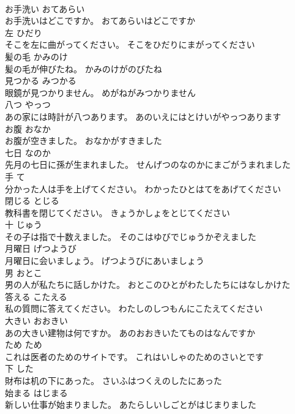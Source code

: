 \documentclass[8pt]{extreport}
\begin{document}
\begin{CJK}{UTF8}{min}
\\	お手洗い	おてあらい	
\\	お手洗いはどこですか。	おてあらいはどこですか	
\\	左	ひだり	
\\	そこを左に曲がってください。	そこをひだりにまがってください	
\\	髪の毛	かみのけ	
\\	髪の毛が伸びたね。	かみのけがのびたね	
\\	見つかる	みつかる	
\\	眼鏡が見つかりません。	めがねがみつかりません	
\\	八つ	やっつ	
\\	あの家には時計が八つあります。	あのいえにはとけいがやっつあります	
\\	お腹	おなか	
\\	お腹が空きました。	おなかがすきました	
\\	七日	なのか	
\\	先月の七日に孫が生まれました。	せんげつのなのかにまごがうまれました	
\\	手	て	
\\	分かった人は手を上げてください。	わかったひとはてをあげてください	
\\	閉じる	とじる	
\\	教科書を閉じてください。	きょうかしょをとじてください	
\\	十	じゅう	
\\	その子は指で十数えました。	そのこはゆびでじゅうかぞえました	
\\	月曜日	げつようび	
\\	月曜日に会いましょう。	げつようびにあいましょう	
\\	男	おとこ	
\\	男の人が私たちに話しかけた。	おとこのひとがわたしたちにはなしかけた	
\\	答える	こたえる	
\\	私の質問に答えてください。	わたしのしつもんにこたえてください	
\\	大きい	おおきい	
\\	あの大きい建物は何ですか。	あのおおきいたてものはなんですか	
\\	ため	ため	
\\	これは医者のためのサイトです。	これはいしゃのためのさいとです	
\\	下	した	
\\	財布は机の下にあった。	さいふはつくえのしたにあった	
\\	始まる	はじまる	
\\	新しい仕事が始まりました。	あたらしいしごとがはじまりました	

\end{CJK}
\end{document}
